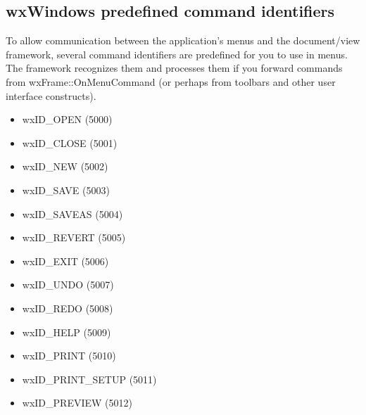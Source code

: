 \subsection{wxWindows predefined command identifiers}\label{predefinedids}

To allow communication between the application's menus and the
document/view framework, several command identifiers are predefined for you
to use in menus. The framework recognizes them and processes them if you
forward commands from wxFrame::OnMenuCommand (or perhaps from toolbars and
other user interface constructs).

\begin{itemize}\itemsep=0pt
\item wxID\_OPEN (5000)
\item wxID\_CLOSE (5001)
\item wxID\_NEW (5002)
\item wxID\_SAVE (5003)
\item wxID\_SAVEAS (5004)
\item wxID\_REVERT (5005)
\item wxID\_EXIT (5006)
\item wxID\_UNDO (5007)
\item wxID\_REDO (5008)
\item wxID\_HELP (5009)
\item wxID\_PRINT (5010)
\item wxID\_PRINT\_SETUP (5011)
\item wxID\_PREVIEW (5012)
\end{itemize}


